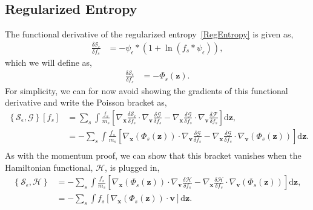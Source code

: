 \documentclass[preprint,12pt]{elsarticle}
\theoremstyle{definition}
\begin{document}
\subsection{Regularized Entropy}

The functional derivative of the regularized entropy~\eqref{RegEntropy} is given as,
\begin{align*}
    \frac{\delta \mathcal{S}_{\epsilon}}{\delta f_s} &= -\psi_{\epsilon} \ast \left(1+\ln \left(f_s \ast \psi_{\epsilon}\right)\right),
\end{align*}
which we will define as,
\begin{align*}
    \frac{\delta \mathcal{S}_{\epsilon}}{\delta f_s} &= - \Phi_s (\boldsymbol{z}).
\end{align*}
For simplicity, we can for now avoid showing the gradients of this functional derivative and write the Poisson bracket as,
\begin{align*}
  \left\{\mathcal{S}_{\epsilon},\mathcal{G}\right\} \left[f_s\right] &= \sum_s \int \frac{f_s}{m_s} \left[\nabla_{\boldsymbol{x}} \frac{\delta \mathcal{S}_{\epsilon}}{\delta f_s} \cdot \nabla_{\boldsymbol{v}} \frac{\delta \mathcal{G}}{\delta f_s} - \nabla_{\boldsymbol{x}} \frac{\delta \mathcal{G}}{\delta f_s} \cdot \nabla_{\boldsymbol{v}} \frac{\delta \mathcal{F}}{\delta f_s} \right] \mathrm{d}\boldsymbol{z}, \\
  &= -\sum_s \int \frac{f_s}{m_s} \left[\nabla_{\boldsymbol{x}} (\Phi_s (\boldsymbol{z})) \cdot \nabla_{\boldsymbol{v}} \frac{\delta \mathcal{G}}{\delta f_s} - \nabla_{\boldsymbol{x}} \frac{\delta \mathcal{G}}{\delta f_s} \cdot \nabla_{\boldsymbol{v}} (\Phi_s (\boldsymbol{z})) \right] \mathrm{d}\boldsymbol{z}. \\
\end{align*}
As with the momentum proof, we can show that this bracket vanishes when the Hamiltonian functional, $\mathcal{H}$, is plugged in,
\begin{align*}
  \left\{\mathcal{S}_{\epsilon},\mathcal{H}\right\} &= -\sum_s \int \frac{f_s}{m_s} \left[\nabla_{\boldsymbol{x}} (\Phi_s (\boldsymbol{z})) \cdot \nabla_{\boldsymbol{v}} \frac{\delta \mathcal{H}}{\delta f_s} - \nabla_{\boldsymbol{x}} \frac{\delta \mathcal{H}}{\delta f_s} \cdot \nabla_{\boldsymbol{v}} (\Phi_s (\boldsymbol{z})) \right] \mathrm{d} \boldsymbol{z}, \\
  &= -\sum_s \int f_s \left[\nabla_{\boldsymbol{x}} (\Phi_s (\boldsymbol{z})) \cdot \boldsymbol{v} \right] \mathrm{d} \boldsymbol{z}. \\
\end{align*}
\end{document}
